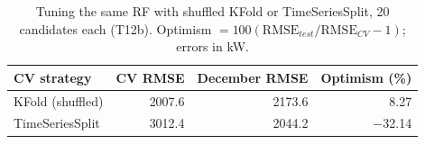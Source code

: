 \begin{table}[H]\centering\small
\caption{Tuning the same RF with shuffled KFold or TimeSeriesSplit, 20 candidates each (T12b). Optimism $=100(\mathrm{RMSE}_{test}/\mathrm{RMSE}_{CV}-1)$; errors in kW.}\label{tab:kfold}
\setlength{\tabcolsep}{4pt}
\begin{tabular}{lrrr}
\toprule
CV strategy & CV RMSE & December RMSE & Optimism (\%) \\
\midrule
KFold (shuffled) & \num{2007.6} & \num{2173.6} & \num{8.27} \\
TimeSeriesSplit & \num{3012.4} & \num{2044.2} & \num{-32.14} \\
\bottomrule\end{tabular}
\end{table}
